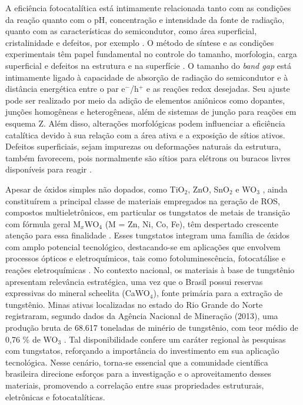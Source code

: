 A eficiência fotocatalítica está intimamente relacionada tanto com as condições da reação quanto com o pH, concentração e intensidade da fonte de radiação, quanto com as características do semicondutor, como área superficial, cristalinidade e defeitos, por exemplo \cite{singh2023review}. O método de síntese e as condições experimentais têm papel fundamental no controle do tamanho, morfologia, carga superficial e defeitos na estrutura e na superfície \cite{nascimento2022influence}. O tamanho do \textit{band gap} está intimamente ligado à capacidade de absorção de radiação do semicondutor e à distância energética entre o par e$^-$/h$^+$ e as reações redox desejadas. Seu ajuste pode ser realizado por meio da adição de elementos aniônicos como dopantes, junções homogêneas e heterogêneas, além de sistemas de junção para reações em esquema Z. Além disso, alterações morfológicas podem influenciar a eficiência catalítica devido à sua relação com a área ativa e a exposição de sítios ativos. Defeitos superficiais, sejam impurezas ou deformações naturais da estrutura, também favorecem, pois normalmente são sítios para elétrons ou buracos livres disponíveis para reagir \cite{wang2018design}.

Apesar de óxidos simples não dopados, como TiO$_2$, ZnO, SnO$_2$ e WO$_3$ \cite{shan2010immobilisation,nascimento2022influence}, ainda constituírem a principal classe de materiais empregados na geração de ROS, compostos multieletrônicos, em particular os tungstatos de metais de transição com fórmula geral M$_x$WO$_4$ (M = Zn, Ni, Co, Fe), têm despertado crescente atenção para essa finalidade \cite{macedo2022zinc,abubakar2022review,costa2023transition}. Esses tungstatos integram uma família de óxidos com amplo potencial tecnológico, destacando-se em aplicações que envolvem processos ópticos e eletroquímicos, tais como fotoluminescência, fotocatálise e reações eletroquímicas \cite{sivaganesh2020sm3+,gao2024synthesis}. No contexto nacional, os materiais à base de tungstênio apresentam relevância estratégica, uma vez que o Brasil possui reservas expressivas do mineral scheelita (CaWO$_4$), fonte primária para a extração de tungstênio. Minas ativas localizadas no estado do Rio Grande do Norte registraram, segundo dados da Agência Nacional de Mineração (2013), uma produção bruta de 68.617 toneladas de minério de tungstênio, com teor médio de 0,76 \% de WO$_3$ \cite{anm2017anuario}. Tal disponibilidade confere um caráter regional às pesquisas com tungstatos, reforçando a importância do investimento em sua aplicação tecnológica. Nesse cenário, torna-se essencial que a comunidade científica brasileira direcione esforços para a investigação e o aproveitamento desses materiais, promovendo a correlação entre suas propriedades estruturais, eletrônicas e fotocatalíticas.

